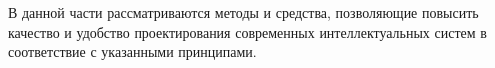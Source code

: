 \begin{partbacktext}
В данной части рассматриваются методы и средства, позволяющие повысить качество и удобство проектирования современных интеллектуальных систем в соответствие с указанными принципами.
\end{partbacktext}




